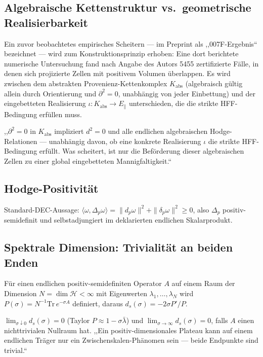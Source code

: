 \subsection{Algebraische Kettenstruktur vs.\ geometrische Realisierbarkeit}

Ein zuvor beobachtetes empirisches Scheitern — im Preprint als
,,007F-Ergebnis`` bezeichnet — wird zum Konstruktionsprinzip erhoben: Eine
dort berichtete numerische Untersuchung fand nach Angabe des Autors 5455
zertifizierte Fälle, in denen sich projizierte Zellen mit positivem
Volumen überlappen. Es wird zwischen dem abstrakten
Provenienz-Kettenkomplex $K_{\mathrm{abs}}$ (algebraisch gültig allein
durch Orientierung und $\partial^2=0$, unabhängig von jeder Einbettung)
und der eingebetteten Realisierung $\iota:K_{\mathrm{abs}}\to E_\parallel$
unterschieden, die die strikte HFF-Bedingung erfüllen muss.

\begin{kernbox}[title={Saubere Isolierung des Scheiterns}]
,,$\partial^2=0$ in $K_{\mathrm{abs}}$ impliziert $d^2=0$ und alle
endlichen algebraischen Hodge-Relationen — unabhängig davon, ob eine
konkrete Realisierung $\iota$ die strikte HFF-Bedingung erfüllt. Was
scheitert, ist nur die Beförderung dieser algebraischen Zellen zu einer
global eingebetteten Mannigfaltigkeit.``
\end{kernbox}

\subsection{Hodge-Positivität}

Standard-DEC-Aussage: $\langle\omega,\Delta_p\omega\rangle=\|d_p\omega\|^2+\|\delta_p\omega\|^2\geq0$,
also $\Delta_p$ positiv-semidefinit und selbstadjungiert im deklarierten
endlichen Skalarprodukt.

\subsection{Spektrale Dimension: Trivialität an beiden Enden}

Für einen endlichen positiv-semidefiniten Operator $A$ auf einem Raum der
Dimension $N=\dim\mathcal H<\infty$ mit Eigenwerten $\lambda_1,\dots,\lambda_N$
wird $P(\sigma)=N^{-1}\mathrm{Tr}\,e^{-\sigma A}$ definiert, daraus
$d_s(\sigma)=-2\sigma P'/P$.

\begin{kernbox}[title={Zwingende Konsequenz}]
$\lim_{\sigma\downarrow0}d_s(\sigma)=0$ (Taylor $P\approx1-\sigma\bar\lambda$)
und $\lim_{\sigma\to\infty}d_s(\sigma)=0$, falls $A$ einen nichttrivialen
Nullraum hat. ,,Ein positiv-dimensionales Plateau kann auf einem
endlichen Träger nur ein Zwischenskalen-Phänomen sein — beide Endpunkte
sind trivial.``
\end{kernbox}

